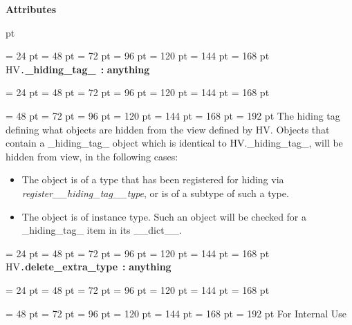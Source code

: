{{{{\Large {\bf Attributes\/}}\par {} pt
} \noindent
\par}
{\par \noindent  \leftskip = 24 pt  \leftmargini = 48 pt  \leftmarginii = 72 pt  \leftmarginiii = 96 pt  \leftmarginiv = 120 pt  \leftmarginv = 144 pt  \leftmarginvi = 168 pt HV{\tt .\/}{\bf {\large {\bf {\_}hiding{\_}tag{\_}\/}}\/}~{\bf :} {\bf  anything\/}\par}
{\par \noindent  \leftskip = 24 pt  \leftmargini = 48 pt  \leftmarginii = 72 pt  \leftmarginiii = 96 pt  \leftmarginiv = 120 pt  \leftmarginv = 144 pt  \leftmarginvi = 168 pt {\par \noindent
{\par \noindent  \leftskip = 48 pt  \leftmargini = 72 pt  \leftmarginii = 96 pt  \leftmarginiii = 120 pt  \leftmarginiv = 144 pt  \leftmarginv = 168 pt  \leftmarginvi = 192 pt  The hiding tag defining what objects are hidden from the view defined
by HV. Objects that contain a {\_}hiding{\_}tag{\_} object which is identical
to HV.{\_}hiding{\_}tag{\_}, will be hidden from view, in the following cases:\begin{itemize}
\item  The object is of a type that has been registered for hiding via  {\em register{\_}{\_}hiding{\_}tag{\_}{\_}type\/}, or is of a subtype of such a type.\item  The object is of instance type. Such an object will be checked
  for a {\_}hiding{\_}tag{\_} item in its {\_}{\_}dict{\_}{\_}.
\end{itemize}
\par}
\par}
\par}
{\par \noindent  \leftskip = 24 pt  \leftmargini = 48 pt  \leftmarginii = 72 pt  \leftmarginiii = 96 pt  \leftmarginiv = 120 pt  \leftmarginv = 144 pt  \leftmarginvi = 168 pt HV{\tt .\/}{\bf {\large {\bf delete{\_}extra{\_}type\/}}\/}~{\bf :} {\bf  anything\/}\par}
{\par \noindent  \leftskip = 24 pt  \leftmargini = 48 pt  \leftmarginii = 72 pt  \leftmarginiii = 96 pt  \leftmarginiv = 120 pt  \leftmarginv = 144 pt  \leftmarginvi = 168 pt {\par \noindent
{\par \noindent  \leftskip = 48 pt  \leftmargini = 72 pt  \leftmarginii = 96 pt  \leftmarginiii = 120 pt  \leftmarginiv = 144 pt  \leftmarginv = 168 pt  \leftmarginvi = 192 pt  For Internal Use
}}}}
